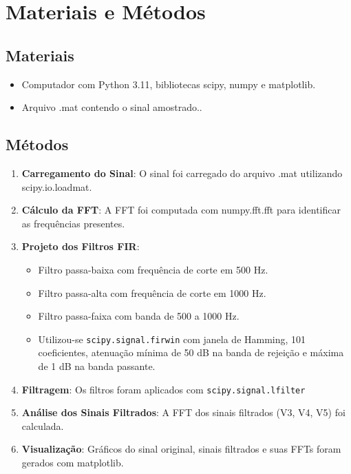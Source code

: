 \documentclass[a4paper,12pt]{article}
\begin{document}
\section{Materiais e Métodos}
\subsection{Materiais}
\begin{itemize}
    \item Computador com Python 3.11, bibliotecas scipy, numpy e matplotlib.
    \item Arquivo .mat contendo o sinal amostrado..
\end{itemize}

\subsection{Métodos}
\begin{enumerate}
    \item \textbf{Carregamento do Sinal}: O sinal foi carregado do arquivo .mat utilizando scipy.io.loadmat.
    \item \textbf{Cálculo da FFT}: A FFT foi computada com numpy.fft.fft para identificar as frequências presentes.
    \item \textbf{Projeto dos Filtros FIR}:
        \begin{itemize}
            \item Filtro passa-baixa com frequência de corte em 500 Hz.
            \item Filtro passa-alta com frequência de corte em 1000 Hz.
            \item Filtro passa-faixa com banda de 500 a 1000 Hz.
            \item Utilizou-se \texttt{scipy.signal.firwin} com janela de Hamming, 101 coeficientes, atenuação mínima de 50 dB na banda de rejeição e máxima de 1 dB na banda passante.
        \end{itemize}
    \item \textbf{Filtragem}: Os filtros foram aplicados com \texttt{scipy.signal.lfilter}
    \item \textbf{Análise dos Sinais Filtrados}: A FFT dos sinais filtrados (V3, V4, V5) foi calculada.
    \item \textbf{Visualização}: Gráficos do sinal original, sinais filtrados e suas FFTs foram gerados com matplotlib.
\end{enumerate}
\end{document}
